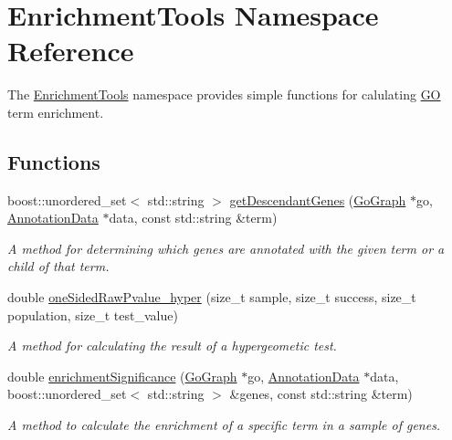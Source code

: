\hypertarget{namespaceEnrichmentTools}{}\section{Enrichment\+Tools Namespace Reference}
\label{namespaceEnrichmentTools}


The \hyperlink{namespaceEnrichmentTools}{Enrichment\+Tools} namespace provides simple functions for calulating \hyperlink{namespaceGO}{GO} term enrichment.  


\subsection*{Functions}
\begin{DoxyCompactItemize}
\item 
boost\+::unordered\+\_\+set$<$ std\+::string $>$ \hyperlink{namespaceEnrichmentTools_a0e1b36171f7c26ceb065fe556b9d7067}{get\+Descendant\+Genes} (\hyperlink{classGoGraph}{Go\+Graph} $\ast$go, \hyperlink{classAnnotationData}{Annotation\+Data} $\ast$data, const std\+::string \&term)
\begin{DoxyCompactList}\small\item\em A method for determining which genes are annotated with the given term or a child of that term. \end{DoxyCompactList}\item 
double \hyperlink{namespaceEnrichmentTools_a94a88459ae63a175a3461c3c26385601}{one\+Sided\+Raw\+Pvalue\+\_\+hyper} (size\+\_\+t sample, size\+\_\+t success, size\+\_\+t population, size\+\_\+t test\+\_\+value)
\begin{DoxyCompactList}\small\item\em A method for calculating the result of a hypergeometic test. \end{DoxyCompactList}\item 
double \hyperlink{namespaceEnrichmentTools_a82aede901a0585f834f0e4a363dc6276}{enrichment\+Significance} (\hyperlink{classGoGraph}{Go\+Graph} $\ast$go, \hyperlink{classAnnotationData}{Annotation\+Data} $\ast$data, boost\+::unordered\+\_\+set$<$ std\+::string $>$ \&genes, const std\+::string \&term)
\begin{DoxyCompactList}\small\item\em A method to calculate the enrichment of a specific term in a sample of genes. \end{DoxyCompactList}\end{DoxyCompactItemize}


